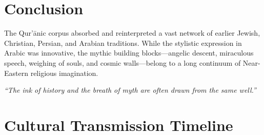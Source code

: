 \documentclass[11pt,a4paper]{article}
\begin{document}
\section*{Conclusion}
The Qur’ānic corpus absorbed and reinterpreted a vast network of earlier Jewish, Christian, Persian, and Arabian traditions.  
While the stylistic expression in Arabic was innovative, the mythic building blocks—angelic descent, miraculous speech, weighing of souls, and cosmic walls—belong to a long continuum of Near-Eastern religious imagination.

\vspace{1cm}
\begin{center}
\textit{“The ink of history and the breath of myth are often drawn from the same well.”}
\end{center}

\newpage
\section*{Cultural Transmission Timeline}
\end{document}
